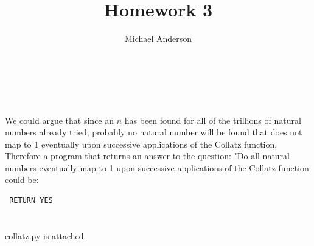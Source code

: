 \documentclass{article}
\author{Michael Anderson}
\title{Homework 3}
\begin{document}
\maketitle
{}
\\
\flushleft
\newpage

\section{}
We could argue that since an $n$ has been found for all of the trillions of
natural numbers already tried, probably no natural number will be found that
does not map to 1 eventually upon successive applications of the Collatz
function. Therefore a program that returns an answer to the question: "Do all
natural numbers eventually map to 1 upon successive applications of the
Collatz function could be:

\begin{verbatim} RETURN YES \end{verbatim}





\section{}
collatz.py is attached.
\end{document}

